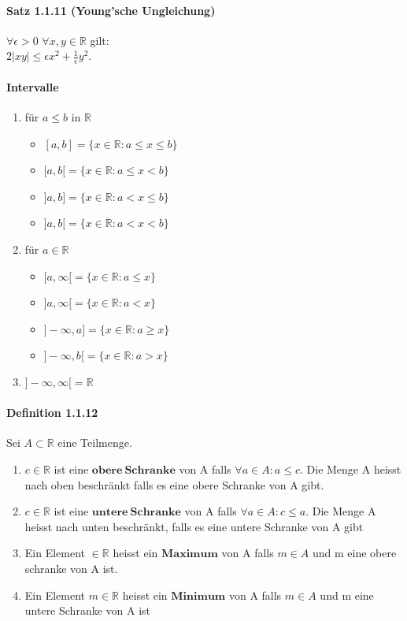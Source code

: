 \documentclass[8pt]{extreport}
\begin{document}
\paragraph{Satz 1.1.11 (Young'sche Ungleichung)} $\forall \epsilon > 0$ \quad $\forall x,y \in \mathbb{R}$ gilt:\\
$2|xy|\leq \epsilon x^2 + \frac{1}{\epsilon}y^2$.
\paragraph{Intervalle}
\begin{enumerate}
\item für $a\leq b$ in $\mathbb{R}$
\begin{itemize}
\item $[a,b] = \{x\in \mathbb{R} : a\leq x \leq b\}$
\item $[a,b[ = \{x\in \mathbb{R} : a\leq x < b\}$
\item $]a,b] = \{x\in \mathbb{R} : a< x \leq b\}$
\item $]a,b[ = \{x\in \mathbb{R} : a< x < b\}$
\end{itemize}
\item für $a \in\mathbb{R}$
\begin{itemize}
\item $[a,\infty[ = \{x\in \mathbb{R} : a\leq x\}$
\item $]a,\infty[ = \{x\in \mathbb{R} : a< x\}$
\item $]-\infty,a] = \{x\in \mathbb{R} : a\geq x\}$
\item $]-\infty,b[ = \{x\in \mathbb{R} : a>x \}$
\end{itemize}
\item $]-\infty,\infty[ = \mathbb{R}$
\end{enumerate}
\paragraph{Definition 1.1.12} Sei $A\subset \mathbb{R}$ eine Teilmenge.
\begin{enumerate}
\item $c\in \mathbb{R}$ ist eine $\mathbf{obere \ Schranke}$ von A falls $\forall a\in A: a\leq c$. Die Menge A heisst nach  oben beschränkt falls es eine obere Schranke von A gibt.
\item $c\in \mathbb{R}$ ist eine $\mathbf{untere \ Schranke}$ von A falls $\forall a \in A: c\leq a$. Die Menge A heisst nach  unten  beschränkt, falls es eine untere Schranke von A gibt
\item Ein Element $\in \mathbb{R}$ heisst ein $\mathbf{Maximum}$ von A falls $m\in A$ und m eine obere schranke von A ist.
\item Ein Element $m\in \mathbb{R}$ heisst ein $\mathbf{Minimum}$ von A falls $m\in A$ und m eine untere Schranke von A ist
\end{enumerate}
\end{document}
